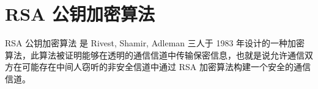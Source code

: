 \section{RSA 公钥加密算法}

RSA 公钥加密算法 \cite{Rivest1983} 是 Rivest, Shamir, Adleman 三人于
1983
年设计的一种加密算法，此算法被证明能够在透明的通信信道中传输保密信息，也就是说允许通信双方在可能存在中间人窃听的非安全信道中通过
RSA 加密算法构建一个安全的通信信道。
